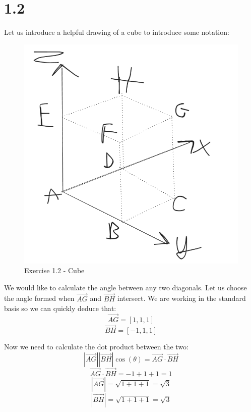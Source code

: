 \documentclass{article}
\begin{document}
\section*{1.2}

Let us introduce a helpful drawing of a cube to introduce some notation:


\begin{figure}[ht]
    \caption{Exercise 1.2 - Cube}
    \centering
    \includegraphics[scale=0.3]{Gregory-1-2-cube.png}
\end{figure}

We would like to calculate the angle between any two diagonals. Let us choose the angle formed
when \(\overrightarrow{AG}\) and \(\overrightarrow{BH}\) intersect. We are working in the standard basis
so we can quickly deduce that:
\begin{equation*}
    \overrightarrow{AG} = [1, 1, 1]
\end{equation*}
\begin{equation*}
    \overrightarrow{BH} = [-1, 1, 1]
\end{equation*}
 
Now we need to calculate the dot product between the two:
\begin{equation*}
    |\overrightarrow{AG}| |\overrightarrow{BH}| \cos(\theta) = \overrightarrow{AG} \cdot \overrightarrow{BH}
\end{equation*}
\begin{equation*}
    \overrightarrow{AG} \cdot \overrightarrow{BH} = -1 + 1 + 1 = 1
\end{equation*}
\begin{equation*}
    |\overrightarrow{AG}| = \sqrt{1 + 1 + 1} = \sqrt{3}
\end{equation*}
\begin{equation*}
    |\overrightarrow{BH}| = \sqrt{1 + 1 + 1} = \sqrt{3}
\end{equation*}
\end{document}
